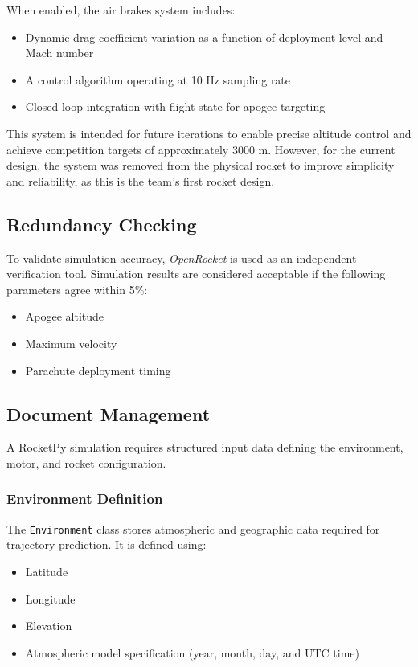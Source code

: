 When enabled, the air brakes system includes:

\begin{itemize}
    \item Dynamic drag coefficient variation as a function of deployment level and Mach number
    \item A control algorithm operating at 10 Hz sampling rate
    \item Closed-loop integration with flight state for apogee targeting
\end{itemize}

This system is intended for future iterations to enable precise altitude control and achieve competition targets of approximately 3000 m. However, for the current design, the system was removed from the physical rocket to improve simplicity and reliability, as this is the team’s first rocket design.

\subsection{Redundancy Checking}

To validate simulation accuracy, \textit{OpenRocket} is used as an independent verification tool. Simulation results are considered acceptable if the following parameters agree within 5\%:

\begin{itemize}
    \item Apogee altitude
    \item Maximum velocity
    \item Parachute deployment timing
\end{itemize}

\subsection{Document Management}

A RocketPy simulation requires structured input data defining the environment, motor, and rocket configuration.

\subsubsection*{Environment Definition}

The \texttt{Environment} class stores atmospheric and geographic data required for trajectory prediction. It is defined using:

\begin{itemize}
    \item Latitude
    \item Longitude
    \item Elevation
    \item Atmospheric model specification (year, month, day, and UTC time)
\end{itemize}

